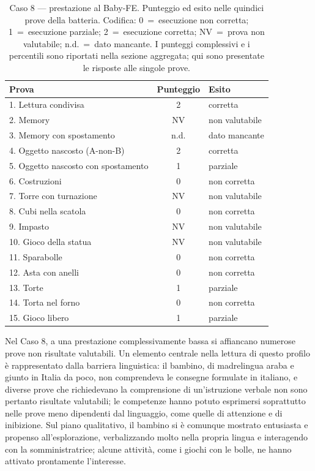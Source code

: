 \begin{table}[htbp]
\centering
\caption[Caso 8 --- prestazione al Baby-FE]{Caso 8 --- prestazione al Baby-FE. Punteggio ed esito nelle quindici prove della batteria. Codifica: 0~=~esecuzione non corretta; 1~=~esecuzione parziale; 2~=~esecuzione corretta; NV~=~prova non valutabile; n.d.~=~dato mancante. I punteggi complessivi e i percentili sono riportati nella sezione aggregata; qui sono presentate le risposte alle singole prove.}
\label{tab:caso8_prove}
\begin{tabular}{|l|c|l|}
\toprule
\textbf{Prova} & \textbf{Punteggio} & \textbf{Esito} \\
\midrule
1. Lettura condivisa & 2 & corretta \\
2. Memory & NV & non valutabile \\
3. Memory con spostamento & n.d. & dato mancante \\
4. Oggetto nascosto (A-non-B) & 2 & corretta \\
5. Oggetto nascosto con spostamento & 1 & parziale \\
6. Costruzioni & 0 & non corretta \\
7. Torre con turnazione & NV & non valutabile \\
8. Cubi nella scatola & 0 & non corretta \\
9. Impasto & NV & non valutabile \\
10. Gioco della statua & NV & non valutabile \\
11. Sparabolle & 0 & non corretta \\
12. Asta con anelli & 0 & non corretta \\
13. Torte & 1 & parziale \\
14. Torta nel forno & 0 & non corretta \\
15. Gioco libero & 1 & parziale \\
\bottomrule
\end{tabular}
\end{table}

Nel Caso 8, a una prestazione complessivamente bassa si affiancano numerose prove non risultate valutabili. Un elemento centrale nella lettura di questo profilo è rappresentato dalla barriera linguistica: il bambino, di madrelingua araba e giunto in Italia da poco, non comprendeva le consegne formulate in italiano, e diverse prove che richiedevano la comprensione di un'istruzione verbale non sono pertanto risultate valutabili; le competenze hanno potuto esprimersi soprattutto nelle prove meno dipendenti dal linguaggio, come quelle di attenzione e di inibizione. Sul piano qualitativo, il bambino si è comunque mostrato entusiasta e propenso all'esplorazione, verbalizzando molto nella propria lingua e interagendo con la somministratrice; alcune attività, come i giochi con le bolle, ne hanno attivato prontamente l'interesse.

